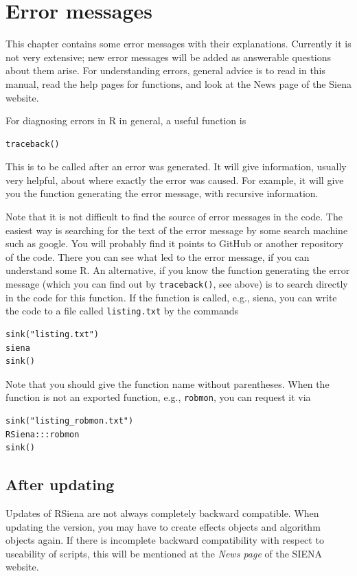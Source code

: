 \documentclass[a4paper,fleqn,11pt]{article}
\newcommand{\+}{\, + \,}
\newcommand{\RS}{{\sf \textsf{RSiena} }}
\newcommand{\SI}{{\sf SIENA }}
\begin{document}
\newpage
\section{Error messages}


This chapter contains some error messages with their explanations.
Currently it is not very  extensive; new error messages will be added
as answerable questions about them arise.
For understanding errors, general advice is to read in this manual,
read the help pages for functions, and look at the News page of the
Siena website.
\medskip

For diagnosing errors in R in general, a useful function is
\begin{verbatim}
traceback()
\end{verbatim}
This is to be called after an error was generated. It will give information,
usually very helpful, about where exactly the error was caused.
For example, it will give you the function generating the error message,
with recursive information.
\medskip

Note that it is not difficult to find the source of error messages in the code.
The easiest way is searching for the text of the error message
by some search machine such as google.
You will probably find it points to GitHub or another repository of the code.
There you can see what led to the error message, if you can understand some R.
An alternative, if you know the function generating the error message
(which you can find out by \texttt{traceback()}, see above)
is to search directly in the code for this function.
If the function is called, e.g., \textsf{siena}, you can write
the code to a file called \texttt{listing.txt} by the commands
\begin{verbatim}
sink("listing.txt")
siena
sink()
\end{verbatim}
Note that you should give the function name without parentheses.
When the function is not an exported function, e.g., \texttt{robmon},
you can request it via
\begin{verbatim}
sink("listing_robmon.txt")
RSiena:::robmon
sink()
\end{verbatim}


\subsection{After updating}

\noindent
Updates of \RS are not always completely backward
compatible. When updating the version, you may have to create
effects objects and algorithm objects again. If there is
incomplete backward compatibility with respect to
useability of scripts, this will be mentioned at the \emph{News page}
of the \SI website.
\end{document}
